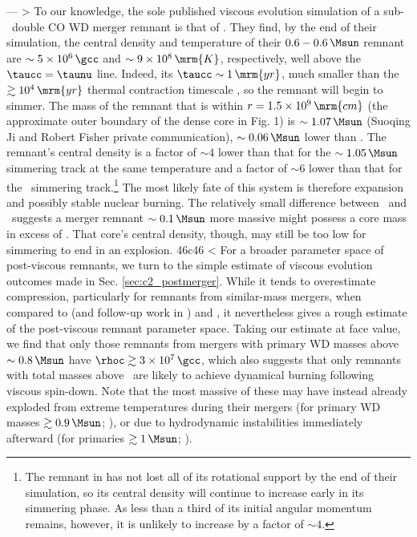 ---
> To our knowledge, the sole published viscous evolution simulation of a sub-\Mch\ double CO WD merger remnant is that of \cite{ji+13}.  They find, by the end of their simulation, the central density and temperature of their $0.6 - 0.6\,\Msun$ remnant are $\sim5\times10^6\,\gcc$ and $\sim9\times10^8\,\mrm{K}$, respectively, well above the $\taucc = \taunu$ line.  Indeed, its $\taucc \sim 1\,\mrm{yr}$, much smaller than the $\gtrsim 10^4\,\mrm{yr}$ thermal contraction timescale \citep{shen+12}, so the remnant will begin to simmer.  The mass of the remnant that is within $r = 1.5\times10^9\,\mrm{cm}$ (the approximate outer boundary of the dense core in \citealt{ji+13} Fig. 1) is $\sim1.07\,\Msun$ (Suoqing Ji and Robert Fisher private communication), $\sim0.06\,\Msun$ lower than \Mcrit.  The remnant's central density is a factor of $\sim4$ lower than that for the $\sim1.05\,\Msun$ simmering track at the same temperature and a factor of $\sim6$ lower than that for the \Mcrit\ simmering track.\footnote{The remnant in \citep{ji+13} has not lost all of its rotational support by the end of their simulation, so its central density will continue to increase early in its simmering phase.  As less than a third of its initial angular momentum remains, however, it is unlikely to increase by a factor of $\sim4$.}  The most likely fate of this system is therefore expansion and possibly stable nuclear burning.  The relatively small difference between \Mc\ and \Mcrit\ suggests a merger remnant $\sim0.1\,\Msun$ more massive might possess a core mass in excess of \Mcrit.  That core's central density, though, may still be too low for simmering to end in an explosion.
46c46
< For a broader parameter space of post-viscous remnants, we turn to the simple estimate of viscous evolution outcomes made in Sec. \ref{sec:c2_postmerger}.  While it tends to overestimate compression, particularly for remnants from similar-mass mergers, when compared to \citeauthor{schw+12} (and follow-up work in \citealt{rask+14}) and \cite{ji+13}, it nevertheless gives a rough estimate of the post-viscous remnant parameter space.  Taking our estimate at face value, we find that only those remnants from mergers with primary WD masses above $\sim0.8\,\Msun$ have $\rhoc \gtrsim 3\times10^7\,\gcc$, which also suggests that only remnants with total masses above \Mch\ are likely to achieve dynamical burning following viscous spin-down.  Note that the most massive of these may have instead already exploded from extreme temperatures during their mergers (for primary WD masses $\gtrsim0.9\,\Msun$; \citealt{pakm+10,pakm+11}), or due to hydrodynamic instabilities immediately afterward (for primaries $\gtrsim1\,\Msun$; \citealt{kash+15}).
